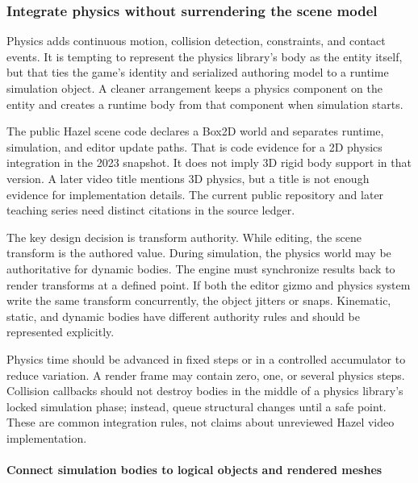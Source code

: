 \subsubsection{Integrate physics without surrendering the scene model}\label{06-engine-ii-ch033-integrate-physics-without-surrendering-the-scene-model}

\hypertarget{06-engine-ii-ch033-integrate-physics-without-surrendering-the-scene-model}{}

Physics adds continuous motion, collision detection, constraints, and contact events. It is tempting to represent the physics library's body as the entity itself, but that ties the game's identity and serialized authoring model to a runtime simulation object. A cleaner arrangement keeps a physics component on the entity and creates a runtime body from that component when simulation starts.

The public Hazel scene code declares a Box2D world and separates runtime, simulation, and editor update paths. That is code evidence for a 2D physics integration in the 2023 snapshot. It does not imply 3D rigid body support in that version. A later video title mentions 3D physics, but a title is not enough evidence for implementation details. The current public repository and later teaching series need distinct citations in the source ledger.

The key design decision is transform authority. While editing, the scene transform is the authored value. During simulation, the physics world may be authoritative for dynamic bodies. The engine must synchronize results back to render transforms at a defined point. If both the editor gizmo and physics system write the same transform concurrently, the object jitters or snaps. Kinematic, static, and dynamic bodies have different authority rules and should be represented explicitly.

Physics time should be advanced in fixed steps or in a controlled accumulator to reduce variation. A render frame may contain zero, one, or several physics steps. Collision callbacks should not destroy bodies in the middle of a physics library's locked simulation phase; instead, queue structural changes until a safe point. These are common integration rules, not claims about unreviewed Hazel video implementation.

\paragraph{Connect simulation bodies to logical objects and rendered meshes}\label{06-engine-ii-ch033-connect-simulation-bodies-to-logical-objects-and-rendered-meshes}

